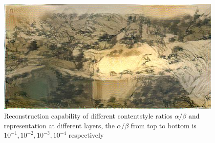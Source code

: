 \documentclass[runningheads]{llncs}
\begin{document}
\begin{figure}[h]
{\begin{minipage}[b]{0.15\textwidth}
\includegraphics[width=1.1\textwidth]{neural_style_transfer/img/fu_stockholm_output/fu_stockholm_conv5-2_1e-4.jpg}
\end{minipage}
}
\caption{Reconstruction capability of different content\/style ratios $\alpha/\beta$ and representation at different layers, the $\alpha/\beta$ from top to bottom is $10^{-1}, 10^{-2}, 10^{-3}, 10^{-4}$ respectively}
\label{fig:sto-fuchun}
\end{figure}
\end{document}
